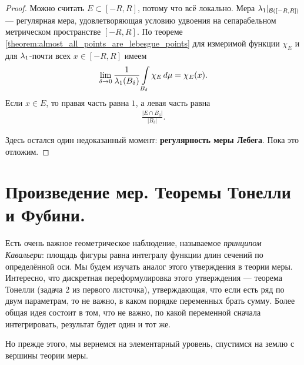 \begin{proof}
 Можно считать $E \subset [-R, R]$, потому что всё локально. Мера $\lambda_{1} \rvert_{\mathcal{B}([-R, R])}$  --- регулярная мера, удовлетворяющая условию удвоения на сепарабельном метрическом пространстве $[-R,R]$. По теореме \ref{theorem:almost_all_points_are_lebesgue_points} для измеримой функции $\chi_E$ и для $\lambda_{1}$-почти всех $x \in [-R, R]$  имеем \begin{align*}
  \lim_{\delta \to 0} \frac{1}{\lambda_{1}(B_{\delta})} \int\limits_{B_{\delta}} \chi_E \, d\mu  = \chi_E(x)
 .\end{align*} Если $x \in E$, то правая часть равна $1$, а левая часть равна \begin{align*}
  \frac{\left| E \cap B_{\delta} \right|}{\left| B_{\delta} \right|}
 .\end{align*}

 Здесь остался один недоказанный момент: \textbf{регулярность меры Лебега}. Пока это отложим.
\end{proof}

\section{Произведение мер. Теоремы Тонелли и Фубини.}

Есть очень важное геометрическое наблюдение, называемое \textit{принципом Кавальери}: площадь фигуры равна интегралу функции длин сечений по определённой оси. Мы будем изучать аналог этого утверждения в теории меры. Интересно, что дискретная переформулировка этого утверждения --- теорема Тонелли (задача 2 из первого листочка), утверждающая, что если есть ряд по двум параметрам, то не важно, в каком порядке переменных брать сумму. Более общая идея состоит в том, что не важно, по какой переменной сначала интегрировать, результат будет один и тот же.

Но прежде этого, мы вернемся на элементарный уровень, спустимся на землю с вершины теории меры.


